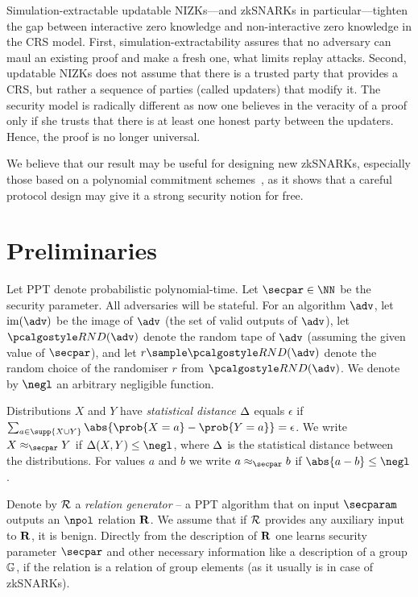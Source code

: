 \documentclass[runningheads,11pt]{llncs}
\theoremstyle{definition}
\begin{document}
Simulation-extractable updatable NIZKs---and zkSNARKs in particular---tighten the gap between interactive zero knowledge and non-interactive zero knowledge in the CRS model.
First, simulation-extractability assures that no adversary can maul an existing proof and make a fresh one, what limits replay attacks.
Second, updatable NIZKs does not assume that there is a trusted party that provides a CRS, but rather a sequence of parties (called updaters) that modify it. The security model is radically different as now one believes in the veracity of a proof only if she trusts that there is at least one honest party between the updaters. Hence, the proof is no longer universal.

We believe that our result may be useful for designing new zkSNARKs, especially those based on a polynomial commitment schemes~\cite{AC:KatZavGol10}, as it shows that a careful protocol design may give it a strong security notion for free.

\section{Preliminaries}
Let PPT denote probabilistic polynomial-time.
Let $\secpar \in \NN$ be the security parameter.
All adversaries will be stateful.
For an algorithm $\adv$, let $\image (\adv)$ be the image of $\adv$ (the set of valid outputs of $\adv$), let $\RND{\adv}$ denote the random tape of $\adv$ (assuming the given value of $\secpar$), and let $r \sample \RND{\adv}$ denote the random choice of the randomiser $r$ from $\RND{\adv}$.
We denote by $\negl$ an arbitrary negligible function.

Distributions $X$ and $Y$ have \emph{statistical distance} $\Delta$ equals $\epsilon$ if $\sum_{a \in \supp{X \cup Y}} \abs{\prob{X = a} - \prob{Y = a}} = \epsilon$.
We write $X \approx_\secpar Y$ if $\SD(X, Y) \leq \negl$, where $\Delta$ is the statistical distance between the distributions.
For values $a$ and $b$ we write $a \approx_\secpar b$ if $\abs{a - b} \leq \negl$.

Denote by $\mathcal{R}$ a \emph{relation generator} -- a PPT algorithm that on input $\secparam$ outputs an $\npol$ relation $\mathbf{R}$. We assume that if $\mathcal{R}$ provides any auxiliary input to $\mathbf{R}$, it is benign. Directly from the description of $\mathbf{R}$ one learns security parameter $\secpar$ and other necessary information like a description of a group $\mathbb{G}$, if the relation is a relation of group elements (as it usually is in case of zkSNARKs).
\end{document}

